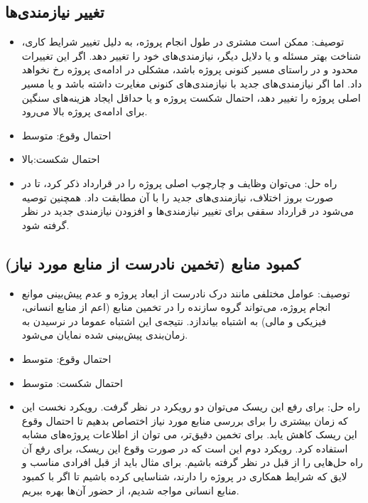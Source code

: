 \subsection{تغییر نیازمندی‌ها}
\begin{itemize}
\item توصیف: ممکن است مشتری در طول انجام پروژه، به دلیل تغییر شرایط کاری، شناخت بهتر مسئله و یا دلایل دیگر، نیازمندی‌های خود را تغییر دهد. اگر این تغییرات محدود و در راستای مسیر کنونی پروژه باشد، مشکلی در ادامه‌ی پروژه رخ نخواهد داد. اما اگر نیازمندی‌های جدید با نیازمندی‌های کنونی مغایرت داشته باشد و یا مسیر اصلی پروژه را تغییر دهد، احتمال شکست پروژه و یا حداقل ایجاد هزینه‌های سنگین برای ادامه‌ی پروژه بالا می‌رود.
\item احتمال وقوع: متوسط
\item احتمال شکست:بالا
\item راه حل: می‌توان وظایف و چارچوب اصلی پروژه را در قرارداد ذکر کرد، تا در صورت بروز اختلاف، نیازمندی‌های جدید را با آن مطابقت داد. همچنین توصیه می‌شود در قرارداد سقفی برای تغییر نیازمندی‌ها و افزودن نیازمندی جدید در نظر گرفته شود. 
\end{itemize}


\subsection{کمبود منابع (تخمین نادرست از منابع مورد نیاز)}
\begin{itemize}
\item توصیف: عوامل مختلفی مانند درک نادرست از ابعاد پروژه و عدم پیش‌بینی موانع انجام پروژه، می‌تواند گروه سازنده را در تخمین منابع (اعم از منابع انسانی، فیزیکی و مالی) به اشتباه بیاندازد. نتیجه‌ی این اشتباه عموما در نرسیدن به زمان‌بندی پیش‌بینی شده نمایان می‌شود.
\item احتمال وقوع: متوسط
\item احتمال شکست: متوسط
\item راه حل: برای رفع این ریسک می‌توان دو رویکرد در نظر گرفت. رویکرد نخست این که زمان بیشتری را برای بررسی منابع مورد نیاز اختصاص بدهیم تا احتمال وقوع این ریسک کاهش یابد. برای تخمین دقیق‌تر، می توان از اطلاعات پروژه‌های مشابه استفاده کرد.
رویکرد دوم این است که در صورت وقوع این ریسک، برای رفع آن راه حل‌هایی را از قبل در نظر گرفته باشیم. برای مثال باید از قبل افرادی مناسب و لایق که شرایط همکاری در پروژه را دارند، شناسایی کرده باشیم تا اگر با کمبود منابع انسانی مواجه شدیم، از حضور آن‌ها بهره ببریم.
\end{itemize}

